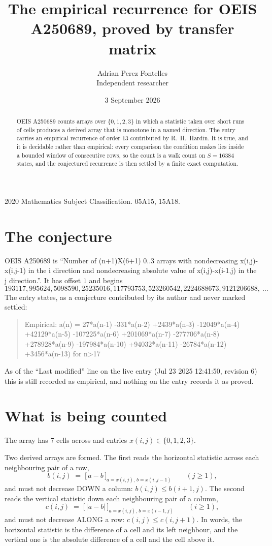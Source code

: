 \documentclass[11pt,a4paper]{article}
\title{The empirical recurrence for OEIS A250689, proved by transfer matrix}
\author{Adrian Perez Fontelles\\ \small Independent researcher}
\date{3 September 2026}
\theoremstyle{plain}
\theoremstyle{definition}
\begin{document}
\maketitle

\begin{abstract}
OEIS A250689 counts arrays over $\{0,1,2,3\}$ in which a statistic taken over short runs
of cells produces a derived array that is monotone in a named direction. The entry carries an
empirical recurrence of order $13$ contributed by R.~H.~Hardin. It is true, and it is
decidable rather than empirical: every comparison the condition makes lies inside a bounded
window of consecutive rows, so the count is a walk count on $S=16384$ states, and the
conjectured recurrence is then settled by a finite exact computation.
\end{abstract}

\noindent\small 2020 Mathematics Subject Classification. 05A15, 15A18.\normalsize

\section{The conjecture}

OEIS A250689 is ``Number of (n+1)X(6+1) 0..3 arrays with nondecreasing x(i,j)-x(i,j-1) in the i direction and nondecreasing absolute value of x(i,j)-x(i-1,j) in the j direction.''. It has offset $1$ and begins
\[
193117, 995624, 5098590, 25235016, 117793753, 523260542, 2224688673, 9121206688,\ \dots
\]
The entry states, as a conjecture contributed by its author and never marked settled:
\begin{quote}
Empirical: a(n) = 27*a(n-1) -331*a(n-2) +2439*a(n-3) -12049*a(n-4) +42129*a(n-5) -107225*a(n-6) +201069*a(n-7) -277706*a(n-8) +278928*a(n-9) -197984*a(n-10) +94032*a(n-11) -26784*a(n-12) +3456*a(n-13) for n>17
\end{quote}
As of the ``Last modified'' line on the live entry (Jul 23 2025 12:41:50, revision 6) this is still
recorded as empirical, and nothing on the entry records it as proved.

\section{What is being counted}

The array has $7$ cells across and entries $x(i,j)\in\{0,1,2,3\}$.

Two derived arrays are formed. The first reads the horizontal statistic across each
neighbouring pair of a row,
\[
b(i,j)\;=\;\bigl[\,a-b\,\bigr]_{a=x(i,j),\,b=x(i,j-1)}\qquad (j\ge1),
\]
and must not decrease DOWN a column: $b(i,j)\le b(i{+}1,j)$. The second reads the vertical
statistic down each neighbouring pair of a column,
\[
c(i,j)\;=\;\bigl[\,\lvert a-b\rvert\,\bigr]_{a=x(i,j),\,b=x(i{-}1,j)}\qquad (i\ge1),
\]
and must not decrease ALONG a row: $c(i,j)\le c(i,j{+}1)$. In words, the horizontal statistic
is the difference of a cell and its left neighbour, and the vertical one is
the absolute difference of a cell and the cell above it.
\end{document}
